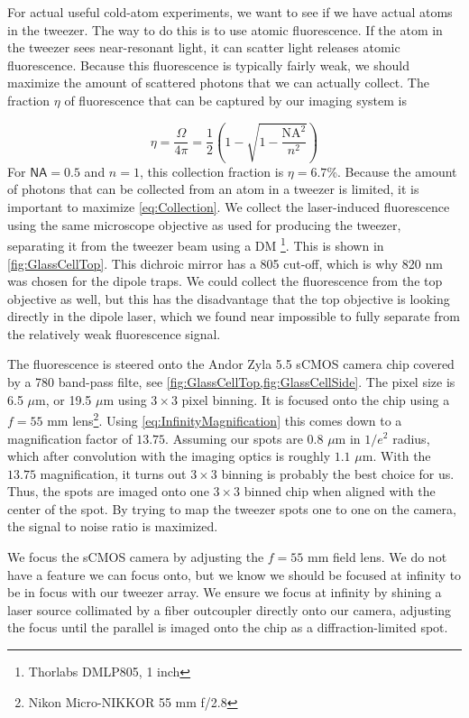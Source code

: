 For actual useful cold-atom experiments, we want to see if we have actual atoms in the tweezer. 
The way to do this is to use atomic fluorescence.
If the atom in the tweezer sees near-resonant light, it can scatter light releases atomic fluorescence. 
Because this fluorescence is typically fairly weak, we should maximize the amount of scattered photons that we can actually collect. 
The fraction $\eta$ of fluorescence that can be captured by our imaging system is 

\begin{equation}\label{eq:Collection}
    \eta = \frac{\Omega}{4\pi} = 
    \frac{1}{2}\left(1-\sqrt{1-\frac{\text{NA}^2}{n^2}}\right)
\end{equation}
For $\textsf{NA}=0.5$ and $n=1$, this collection fraction is $\eta =6.7$\%. 
Because the amount of photons that can be collected from an atom in a tweezer is limited, it is important to maximize \cref{eq:Collection}.
We collect the laser-induced fluorescence using the same microscope objective as used for producing the tweezer, separating it from the tweezer beam using a \ac{DM} \footnote{Thorlabs DMLP805, 1 inch}.
This is shown in \cref{fig:GlassCellTop}.
This dichroic mirror has a 805 cut-off, which is why 820 nm was chosen for the dipole traps.
We could collect the fluorescence from the top objective as well, but this has the disadvantage that the top objective is looking directly in the dipole laser, which we found near impossible to fully separate from the relatively weak fluorescence signal. 

The fluorescence is steered onto the Andor Zyla 5.5 sCMOS camera chip covered by a 780 band-pass filte, see \cref{fig:GlassCellTop,fig:GlassCellSide}.
The pixel size is 6.5 $\mu$m, or 19.5 $\mu$m using $3\times3$ pixel binning. 
It is focused onto the chip using a $f= 55$ mm lens\footnote{Nikon Micro-NIKKOR 55 mm f/2.8}.
Using \cref{eq:InfinityMagnification} this comes down to a magnification factor of $13.75$.
Assuming our spots are $0.8$ $\mu$m in $1/e^2$ radius, which after convolution with the imaging optics is roughly $1.1$ $\mu$m.
With the $13.75$ magnification, it turns out $3\times 3$ binning is probably the best choice for us. 
Thus, the spots are imaged onto one $3\times3$ binned chip when aligned with the center of the spot.
By trying to map the tweezer spots one to one on the camera, the signal to noise ratio is maximized. 

We focus the sCMOS camera by adjusting the $f=55$ mm field lens.
We do not have a feature we can focus onto, but we know we should be focused at infinity to be in focus with our tweezer array. 
We ensure we focus at infinity by shining a laser source collimated by a fiber outcoupler directly onto our camera, adjusting the focus until the parallel is imaged onto the chip as a diffraction-limited spot. 



